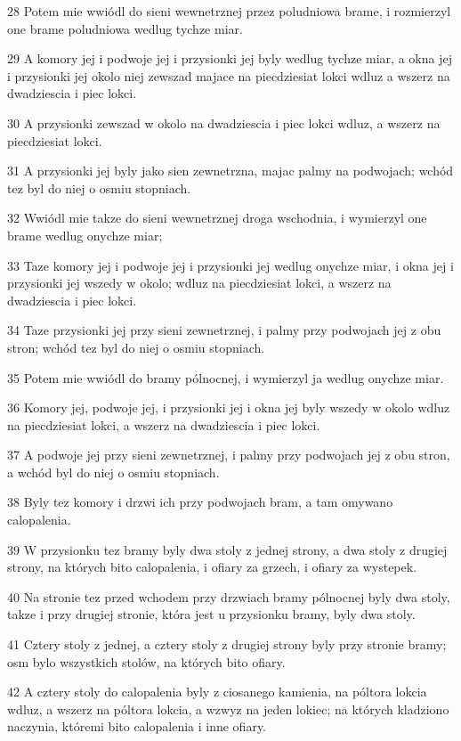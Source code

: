 \par 28 Potem mie wwiódl do sieni wewnetrznej przez poludniowa brame, i rozmierzyl one brame poludniowa wedlug tychze miar.
\par 29 A komory jej i podwoje jej i przysionki jej byly wedlug tychze miar, a okna jej i przysionki jej okolo niej zewszad majace na piecdziesiat lokci wdluz a wszerz na dwadziescia i piec lokci.
\par 30 A przysionki zewszad w okolo na dwadziescia i piec lokci wdluz, a wszerz na piecdziesiat lokci.
\par 31 A przysionki jej byly jako sien zewnetrzna, majac palmy na podwojach; wchód tez byl do niej o osmiu stopniach.
\par 32 Wwiódl mie takze do sieni wewnetrznej droga wschodnia, i wymierzyl one brame wedlug onychze miar;
\par 33 Taze komory jej i podwoje jej i przysionki jej wedlug onychze miar, i okna jej i przysionki jej wszedy w okolo; wdluz na piecdziesiat lokci, a wszerz na dwadziescia i piec lokci.
\par 34 Taze przysionki jej przy sieni zewnetrznej, i palmy przy podwojach jej z obu stron; wchód tez byl do niej o osmiu stopniach.
\par 35 Potem mie wwiódl do bramy pólnocnej, i wymierzyl ja wedlug onychze miar.
\par 36 Komory jej, podwoje jej, i przysionki jej i okna jej byly wszedy w okolo wdluz na piecdziesiat lokci, a wszerz na dwadziescia i piec lokci.
\par 37 A podwoje jej przy sieni zewnetrznej, i palmy przy podwojach jej z obu stron, a wchód byl do niej o osmiu stopniach.
\par 38 Byly tez komory i drzwi ich przy podwojach bram, a tam omywano calopalenia.
\par 39 W przysionku tez bramy byly dwa stoly z jednej strony, a dwa stoly z drugiej strony, na których bito calopalenia, i ofiary za grzech, i ofiary za wystepek.
\par 40 Na stronie tez przed wchodem przy drzwiach bramy pólnocnej byly dwa stoly, takze i przy drugiej stronie, która jest u przysionku bramy, byly dwa stoly.
\par 41 Cztery stoly z jednej, a cztery stoly z drugiej strony byly przy stronie bramy; osm bylo wszystkich stolów, na których bito ofiary.
\par 42 A cztery stoly do calopalenia byly z ciosanego kamienia, na póltora lokcia wdluz, a wszerz na póltora lokcia, a wzwyz na jeden lokiec; na których kladziono naczynia, któremi bito calopalenia i inne ofiary.
